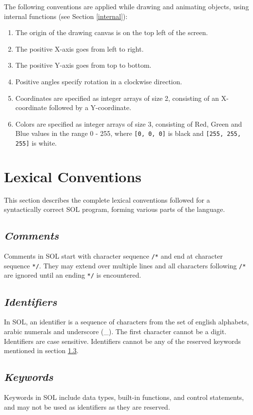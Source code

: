 \documentclass[letterpaper,12pt]{article}
\begin{document}
The following conventions are applied while drawing and animating objects, using internal functions (see Section \ref{internal}):

	\begin{enumerate}
		\itemsep0em
		\item The origin of the drawing canvas is on the top left of the screen.
		\item The positive X-axis goes from left to right.
		\item The positive Y-axis goes from top to bottom.
		\item Positive angles specify rotation in a clockwise direction.
		\item Coordinates are specified as integer arrays of size 2, consisting of an X-coordinate followed by a Y-coordinate.
		\item Colors are specified as integer arrays of size 3, consisting of Red, Green and Blue values in the range 0 - 255, where \texttt{[0, 0, 0]} is black and \texttt{[255, 255, 255]} is white.
	\end{enumerate}

\section{Lexical Conventions}

This section describes the complete lexical conventions followed for a syntactically correct SOL program, forming various parts of the language.

    \subsection{\textit{Comments}}
    Comments in SOL start with character sequence \texttt{/*} and end at character sequence \texttt{*/}. They may extend over multiple lines and all characters following \texttt{/*} are ignored until an ending \texttt{*/} is encountered.

    \subsection{\textit{Identifiers}}
    In SOL, an identifier is a sequence of characters from the set of english alphabets, arabic numerals and underscore (\_). The first character cannot be a digit. Identifiers are case sensitive. Identifiers cannot be any of the reserved keywords mentioned in section \ref{keywords}.

    \subsection{\textit{Keywords}} \label{keywords}
    Keywords in SOL include data types, built-in functions, and control statements, and may not be used as identifiers as they are reserved.
\end{document}

